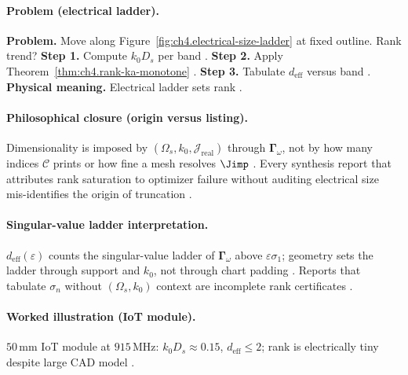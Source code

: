 \paragraph{Problem (electrical ladder).}
\textbf{Problem.} Move along Figure~\ref{fig:ch4.electrical-size-ladder} at fixed outline. Rank trend?
\textbf{Step 1.} Compute \(k_{0}D_{s}\) per band \cite{jackson1999,harrington2001}.
\textbf{Step 2.} Apply Theorem~\ref{thm:ch4.rank-ka-monotone} \cite{hansen1988,stratton1941}.
\textbf{Step 3.} Tabulate \(d_{\mathrm{eff}}\) versus band \cite{devaney2004,collin2001}.
\textbf{Physical meaning.} Electrical ladder sets rank \cite{stratton1941,harrington2001}.

\paragraph{Philosophical closure (origin versus listing).}
Dimensionality is imposed by \((\Omega_{s},k_{0},\mathcal{J}_{\mathrm{real}})\) through \(\boldsymbol{\Gamma}_\omega\), not by how many indices \(\mathcal{C}\)
prints or how fine a mesh resolves \(\Jimp\) \cite{stratton1941,harrington2001,jackson1999,hansen1988,devaney2004}. Every synthesis report that attributes
rank saturation to optimizer failure without auditing electrical size mis-identifies the origin of truncation \cite{collin2001,stratton1941}.

\paragraph{Singular-value ladder interpretation.}
\(d_{\mathrm{eff}}(\varepsilon)\) counts the singular-value ladder of \(\boldsymbol{\Gamma}_\omega\) above \(\varepsilon\sigma_{1}\); geometry sets the ladder
through support and \(k_{0}\), not through chart padding \cite{harrington2001,hansen1988,stratton1941,devaney2004,jackson1999,collin2001}. Reports that
tabulate \(\sigma_{n}\) without \((\Omega_{s},k_{0})\) context are incomplete rank certificates \cite{stratton1941,harrington2001}.

\paragraph{Worked illustration (IoT module).}
\(50\,\mathrm{mm}\) IoT module at \(915\,\mathrm{MHz}\): \(k_{0}D_{s}\approx0.15\), \(d_{\mathrm{eff}}\le2\); rank is electrically tiny despite large CAD model
\cite{harrington2001,jackson1999,stratton1941,hansen1988,devaney2004,collin2001}.

